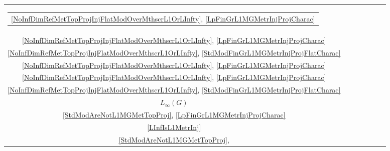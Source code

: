 \begin{scriptsize}
\begin{longtable}{|c|c|c|c|c|c|c|}
\begin{tabular}{@{}c@{}}
            {\ref{NoInfDimRefMetTopProjInjFlatModOverMthscrL1OrLInfty}},
            {\ref{LpFinGrL1MGMetrInjProjCharac}}
        \end{tabular} & 
        \begin{tabular}{@{}c@{}}$G= \{e_G \}$ \\
            {\ref{NoInfDimRefMetTopProjInjFlatModOverMthscrL1OrLInfty}},
            {\ref{LpFinGrL1MGMetrInjProjCharac}}
        \end{tabular} & 
        \begin{tabular}{@{}c@{}}
            $G= \{e_G \}$ \\
            {\ref{NoInfDimRefMetTopProjInjFlatModOverMthscrL1OrLInfty}},
            {\ref{StdModFinGrL1MGMetrInjProjFlatCharac}}
        \end{tabular} & 
        \begin{tabular}{@{}c@{}}
            $G= \{e_G \}$ \\
            {\ref{NoInfDimRefMetTopProjInjFlatModOverMthscrL1OrLInfty}},
            {\ref{LpFinGrL1MGMetrInjProjCharac}}
        \end{tabular} & 
        \begin{tabular}{@{}c@{}}
            $G= \{e_G \}$ \\
            {\ref{NoInfDimRefMetTopProjInjFlatModOverMthscrL1OrLInfty}},
            {\ref{LpFinGrL1MGMetrInjProjCharac}}
        \end{tabular} & 
        \begin{tabular}{@{}c@{}}
            $G= \{e_G \}$ \\
            {\ref{NoInfDimRefMetTopProjInjFlatModOverMthscrL1OrLInfty}},
            {\ref{StdModFinGrL1MGMetrInjProjFlatCharac}}
        \end{tabular} \\
    \hline
        $L_\infty(G)$ & 
        \begin{tabular}{@{}c@{}}
            $G= \{e_G \}$ \\
            {\ref{StdModAreNotL1MGMetTopProj}},
            {\ref{LpFinGrL1MGMetrInjProjCharac}}
        \end{tabular} & 
        \begin{tabular}{@{}c@{}}
            $G$ любая \\
            {\ref{LInfIsL1MetrInj}}
        \end{tabular} & 
        \begin{tabular}{@{}c@{}}
            $G= \{e_G \}$ \\
            {\ref{StdModAreNotL1MGMetTopProj}},

\end{tabular}
\end{longtable}
\end{scriptsize}

